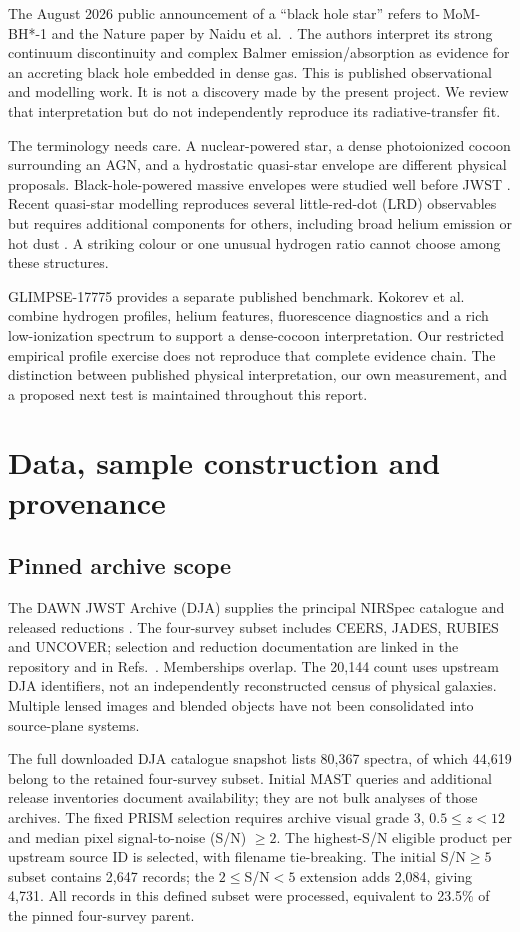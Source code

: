 \documentclass[11pt,a4paper]{article}
\begin{document}
The August 2026 public announcement of a ``black hole star'' refers to MoM-BH*-1 and the Nature paper by Naidu et al.\ \cite{naidu}. The authors interpret its strong continuum discontinuity and complex Balmer emission/absorption as evidence for an accreting black hole embedded in dense gas. This is published observational and modelling work. It is not a discovery made by the present project. We review that interpretation but do not independently reproduce its radiative-transfer fit.

The terminology needs care. A nuclear-powered star, a dense photoionized cocoon surrounding an AGN, and a hydrostatic quasi-star envelope are different physical proposals. Black-hole-powered massive envelopes were studied well before JWST \cite{begelman}. Recent quasi-star modelling reproduces several little-red-dot (LRD) observables but requires additional components for others, including broad helium emission or hot dust \cite{gentile}. A striking colour or one unusual hydrogen ratio cannot choose among these structures.

GLIMPSE-17775 provides a separate published benchmark. Kokorev et al.\ \cite{kokorev} combine hydrogen profiles, helium features, fluorescence diagnostics and a rich low-ionization spectrum to support a dense-cocoon interpretation. Our restricted empirical profile exercise does not reproduce that complete evidence chain. The distinction between published physical interpretation, our own measurement, and a proposed next test is maintained throughout this report.

\section{Data, sample construction and provenance}
\subsection{Pinned archive scope}
The DAWN JWST Archive (DJA) supplies the principal NIRSpec catalogue and released reductions \cite{dja}. The four-survey subset includes CEERS, JADES, RUBIES and UNCOVER; selection and reduction documentation are linked in the repository and in Refs.\ \cite{ceers,jades,rubies,uncover}. Memberships overlap. The 20,144 count uses upstream DJA identifiers, not an independently reconstructed census of physical galaxies. Multiple lensed images and blended objects have not been consolidated into source-plane systems.

The full downloaded DJA catalogue snapshot lists 80,367 spectra, of which 44,619 belong to the retained four-survey subset. Initial MAST queries and additional release inventories document availability; they are not bulk analyses of those archives. The fixed PRISM selection requires archive visual grade 3, $0.5\le z<12$ and median pixel signal-to-noise (S/N) $\ge2$. The highest-S/N eligible product per upstream source ID is selected, with filename tie-breaking. The initial S/N$\ge5$ subset contains 2,647 records; the $2\le$S/N$<5$ extension adds 2,084, giving 4,731. All records in this defined subset were processed, equivalent to 23.5\% of the pinned four-survey parent.
\end{document}
